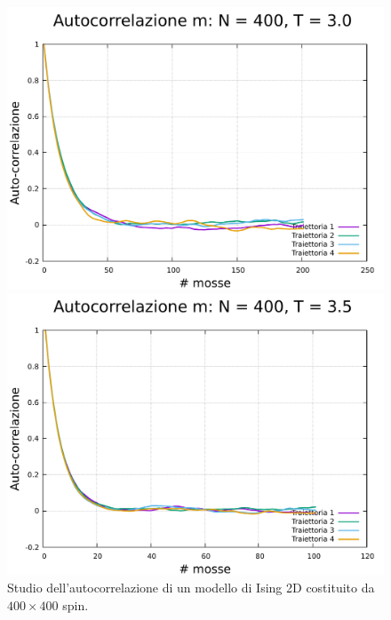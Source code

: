 \begin{figure}[htbp]
    \begin{minipage}{0.45\textwidth}  
      \centering
      \includegraphics[page=1, width=\textwidth]{Immagini/simIsing2D/metro/tcorr/auto_400_3.0.pdf}
      \caption{$T\,=\,3.0$}
    \end{minipage}\hfill
    \begin{minipage}{0.45\textwidth}  
      \centering
      \includegraphics[page=1, width=\textwidth]{Immagini/simIsing2D/metro/tcorr/auto_400_3.5.pdf}
      \caption{$T\,=\,3.5$}
    \end{minipage}
    \caption{Studio dell'autocorrelazione di un modello di Ising 2D costituito da $400 \times 400$ spin.}
\end{figure}

